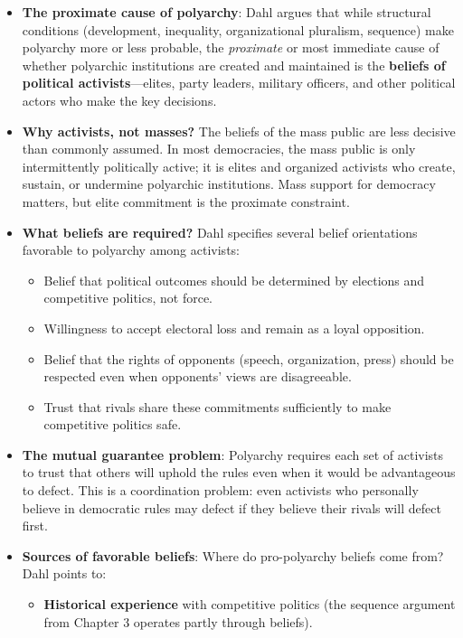 \documentclass[12pt]{article}
\begin{document}
\begin{itemize}[leftmargin=*, itemsep=4pt]
    \item \textbf{The proximate cause of polyarchy}: Dahl argues that while structural conditions (development, inequality, organizational pluralism, sequence) make polyarchy more or less probable, the \emph{proximate} or most immediate cause of whether polyarchic institutions are created and maintained is the \textbf{beliefs of political activists}---elites, party leaders, military officers, and other political actors who make the key decisions.
    \item \textbf{Why activists, not masses?} The beliefs of the mass public are less decisive than commonly assumed. In most democracies, the mass public is only intermittently politically active; it is elites and organized activists who create, sustain, or undermine polyarchic institutions. Mass support for democracy matters, but elite commitment is the proximate constraint.
    \item \textbf{What beliefs are required?} Dahl specifies several belief orientations favorable to polyarchy among activists:
        \begin{itemize}
            \item Belief that political outcomes should be determined by elections and competitive politics, not force.
            \item Willingness to accept electoral loss and remain as a loyal opposition.
            \item Belief that the rights of opponents (speech, organization, press) should be respected even when opponents' views are disagreeable.
            \item Trust that rivals share these commitments sufficiently to make competitive politics safe.
        \end{itemize}
    \item \textbf{The mutual guarantee problem}: Polyarchy requires each set of activists to trust that others will uphold the rules even when it would be advantageous to defect. This is a coordination problem: even activists who personally believe in democratic rules may defect if they believe their rivals will defect first.
    \item \textbf{Sources of favorable beliefs}: Where do pro-polyarchy beliefs come from? Dahl points to:
        \begin{itemize}
            \item \textbf{Historical experience} with competitive politics (the sequence argument from Chapter 3 operates partly through beliefs).

\end{itemize}
\end{itemize}
\end{document}
